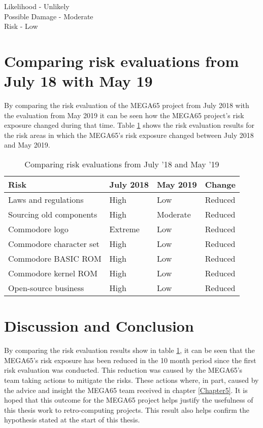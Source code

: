 Likelihood - Unlikely \\
Possible Damage - Moderate \\  
Risk - Low \\

\section{Comparing risk evaluations from July 18 with May 19}
By comparing the risk evaluation of the MEGA65 project from July 2018 with the evaluation from May 2019 it can be seen how the MEGA65 project's risk exposure changed during that time. Table \ref{tab:table1} shows the risk evaluation results for the risk areas in which the MEGA65's risk exposure changed between July 2018 and May 2019.

\begin{table}[h!]
  \begin{center}
    \caption{Comparing risk evaluations from July '18 and May '19}
    \label{tab:table1}
    \begin{tabular}{l|l|l|l} %
    	\textbf{Risk} 	&	\textbf{July 2018} & \textbf{May 2019} & \textbf{Change}\\
      \hline
     Laws and regulations 				& High		& Low 		& Reduced\\
     Sourcing old components			& High		& Moderate	& Reduced \\
     Commodore logo						& Extreme	& Low  		& Reduced\\
     Commodore character set			& High		& Low  		& Reduced\\
     Commodore BASIC ROM				& High		& Low 		& Reduced \\
     Commodore kernel ROM				& High		& Low  		& Reduced\\
     Open-source business				& High		& Low  		& Reduced\\
    \end{tabular}
  \end{center}
\end{table}

\section{Discussion and Conclusion}
By comparing the risk evaluation results show in table \ref{tab:table1}, it can be seen that the MEGA65's risk exposure has been reduced in the 10 month period since the first risk evaluation was conducted. This reduction was caused by the MEGA65's team taking actions to mitigate the risks. These actions where, in part, caused by the advice and insight the MEGA65 team received in chapter \ref{Chapter5}. It is hoped that this outcome for the MEGA65 project helps justify the usefulness of this thesis work to retro-computing projects. This result also helps confirm the hypothesis stated at the start of this thesis. 

